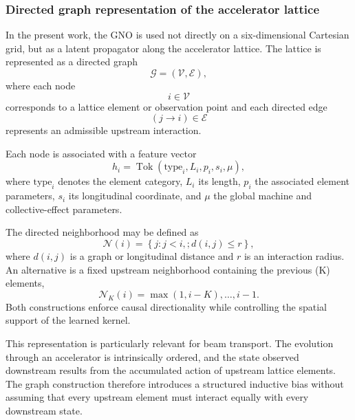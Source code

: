 \subsubsection{Directed graph representation of the accelerator lattice}
\label{subsubsec:gno_lattice_graph}

In the present work, the GNO is used not directly on a six-dimensional Cartesian grid, but as a latent propagator along the accelerator lattice. The lattice is represented as a directed graph
\begin{equation}
\mathcal{G}
=
(\mathcal{V},\mathcal{E}),
\end{equation}
where each node
\begin{equation}
i\in\mathcal{V}
\end{equation}
corresponds to a lattice element or observation point and each directed edge
\begin{equation}
(j\rightarrow i)\in\mathcal{E}
\end{equation}
represents an admissible upstream interaction.

Each node is associated with a feature vector
\begin{equation}
h_i
=
\operatorname{Tok}
\left(
\mathrm{type}_i,
L_i,
p_i,
s_i,
\mu
\right),
\label{eq:gno_node_token}
\end{equation}
where $\mathrm{type}_i$ denotes the element category, $L_i$ its length, $p_i$ the associated element parameters, $s_i$ its longitudinal coordinate, and $\mu$ the global machine and collective-effect parameters.

The directed neighborhood may be defined as
\begin{equation}
\mathcal{N}(i)
=
\left\{
j:
j<i,;
d(i,j)\le r
\right\},
\label{eq:gno_directed_neighborhood}
\end{equation}
where $d(i,j)$ is a graph or longitudinal distance and $r$ is an interaction radius. An alternative is a fixed upstream neighborhood containing the previous (K) elements, 
\begin{equation}
\mathcal{N}_{K}(i)
=
{
\max(1,i-K),
\ldots,
i-1
}.
\label{eq:gno_k_neighborhood}
\end{equation}
Both constructions enforce causal directionality while controlling the spatial support of the learned kernel.

This representation is particularly relevant for beam transport. The evolution through an accelerator is intrinsically ordered, and the state observed downstream results from the accumulated action of upstream lattice elements. The graph construction therefore introduces a structured inductive bias without assuming that every upstream element must interact equally with every downstream state.


